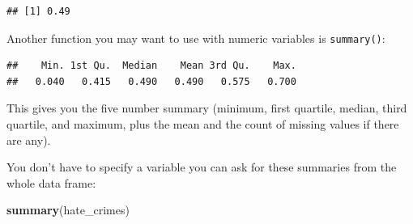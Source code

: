 \documentclass[]{book}
\newenvironment{Shaded}{\begin{snugshade}}{\end{snugshade}}
\newcommand{\KeywordTok}[1]{\textcolor[rgb]{0.13,0.29,0.53}{\textbf{#1}}}
\newcommand{\NormalTok}[1]{#1}
\newcommand{\OperatorTok}[1]{\textcolor[rgb]{0.81,0.36,0.00}{\textbf{#1}}}
\theoremstyle{definition}
\theoremstyle{definition}
\theoremstyle{definition}
\theoremstyle{remark}
\begin{document}
\begin{Shaded}
\end{Shaded}

\begin{verbatim}
## [1] 0.49
\end{verbatim}

Another function you may want to use with numeric variables is
\texttt{summary()}:

\begin{Shaded}
\end{Shaded}

\begin{verbatim}
##    Min. 1st Qu.  Median    Mean 3rd Qu.    Max. 
##   0.040   0.415   0.490   0.490   0.575   0.700
\end{verbatim}

This gives you the five number summary (minimum, first quartile, median,
third quartile, and maximum, plus the mean and the count of missing
values if there are any).

You don't have to specify a variable you can ask for these summaries
from the whole data frame:

\begin{Shaded}
\begin{Highlighting}[]
\KeywordTok{summary}\NormalTok{(hate_crimes)}
\end{Highlighting}
\end{Shaded}
\end{document}

